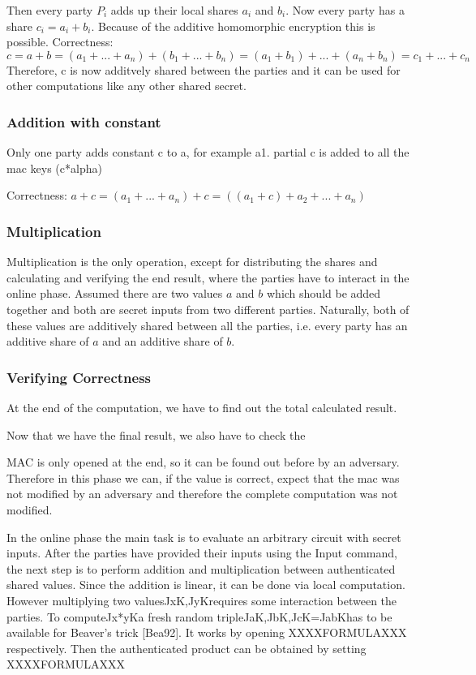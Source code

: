 \documentclass[english,runningheads,a4paper]{llncs}[2018/03/10]
\begin{document}
Then every party \( P_i\) adds up their local shares \( a_i\) and  \( b_i\). Now every party has a share  \( c_i=a_i+b_i\). Because of the additive homomorphic encryption this is possible.
Correctness: \( c=a+b=(a_1+...+a_n)+( b_1+...+b_n)=(a_1+b_1)+...+(a_n+b_n)=c_1+...+c_n\)
Therefore, c is now additvely shared between the parties and it can be used for other computations like any other shared secret.


\subsubsection{Addition with constant}
Only one party adds constant c to a, for example a1. partial c is added to all the mac keys (c*alpha)

Correctness: \( a+c=(a_1+...+a_n)+c=((a_1+c)+a_2+...+a_n)\)



\subsubsection{Multiplication}
Multiplication is the only operation, except for distributing the shares and calculating and verifying the end result, where the parties have to interact in the online phase.
Assumed there are two values \( a\) and \( b\) which should be added together and both are secret inputs from two different parties. Naturally, both of these values are additively shared between all the parties, i.e. every party has an additive share of \( a\) and an additive share of \( b\). 


\subsubsection{Verifying Correctness}
At the end of the computation, we have to find out the total calculated result.


Now that we have the final result, we also have to check the 

MAC is only opened at the end, so it can be found out before by an adversary. Therefore in this phase we can, if the value is correct, expect that the mac was not modified by an adversary and therefore the complete computation was not modified.



In the online phase the main task is to evaluate an arbitrary circuit with secret inputs. After the parties have provided their inputs using the Input command, the next step is to perform addition and multiplication between authenticated shared values. Since the addition is linear, it can be done via local computation. However multiplying two valuesJxK,JyKrequires some interaction between the parties. To computeJx*yKa fresh random tripleJaK,JbK,JcK=JabKhas to be available for Beaver’s trick [Bea92]. It works by opening XXXXFORMULAXXX  respectively. Then the authenticated product can be obtained by setting XXXXFORMULAXXX
\end{document}
